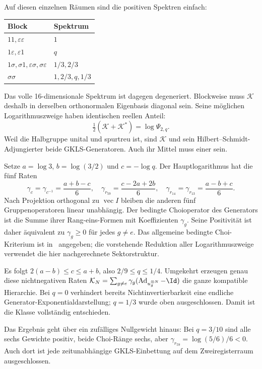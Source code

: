 Auf diesen einzelnen Räumen sind die positiven Spektren einfach:
\begin{center}
\begin{tabular}{ll}
\toprule
Block & Spektrum\\\midrule
$11,\varepsilon\varepsilon$ & $1$\\
$1\varepsilon,\varepsilon1$ & $q$\\
$1\sigma,\sigma1,\varepsilon\sigma,\sigma\varepsilon$ & $1/3,2/3$\\
$\sigma\sigma$ & $1,2/3,q,1/3$\\\bottomrule
\end{tabular}
\end{center}
Das volle 16-dimensionale Spektrum ist dagegen degeneriert.
Blockweise muss $\mathcal K$ deshalb in derselben orthonormalen Eigenbasis diagonal sein. Seine möglichen Logarithmuszweige haben identischen reellen Anteil:
\begin{equation}
\tfrac12(\mathcal K+\mathcal K^*)=\log\Psi_{2,q}.
\end{equation}
Weil die Halbgruppe unital und spurtreu ist, sind $\mathcal K$ und sein Hilbert--Schmidt-Adjungierter beide GKLS-Generatoren. Auch ihr Mittel muss einer sein.

Setze $a=\log3$, $b=\log(3/2)$ und $c=-\log q$. Der Hauptlogarithmus hat die fünf Raten
\begin{equation}
\gamma_c=\gamma_{c^{-1}}=\frac{a+b-c}{6},\quad
\gamma_{r_{59}}=\frac{c-2a+2b}{6},\quad
\gamma_{r_{14}}=\gamma_{r_{13}}=\frac{a-b+c}{6}.
\end{equation}
Nach Projektion orthogonal zu $\operatorname{vec}I$ bleiben die anderen fünf Gruppenoperatoren linear unabhängig. Der bedingte Choioperator des Generators ist die Summe ihrer Rang-eins-Formen mit Koeffizienten $\gamma_g$. Seine Positivität ist daher äquivalent zu $\gamma_g\ge0$ für jedes $g\ne e$. Das allgemeine bedingte Choi-Kriterium ist in~\cite{wolfjoint} angegeben; die vorstehende Reduktion aller Logarithmuszweige verwendet die hier nachgerechnete Sektorstruktur.

Es folgt $2(a-b)\le c\le a+b$, also $2/9\le q\le1/4$.
Umgekehrt erzeugen genau diese nichtnegativen Raten
$\mathcal K_N=\sum_{g\ne e}\gamma_g(\operatorname{Ad}_{u_g^{\otimes N}}-\Id)$
die ganze kompatible Hierarchie. Bei $q=0$ verhindert bereits Nichtinvertierbarkeit eine endliche Generator-Exponentialdarstellung; $q=1/3$ wurde oben ausgeschlossen. Damit ist die Klasse vollständig entschieden.

Das Ergebnis geht über ein zufälliges Nullgewicht hinaus: Bei $q=3/10$ sind alle sechs Gewichte positiv, beide Choi-Ränge sechs, aber
$\gamma_{r_{59}}=\log(5/6)/6<0$. Auch dort ist jede zeitunabhängige GKLS-Einbettung auf dem Zweiregisterraum ausgeschlossen.


